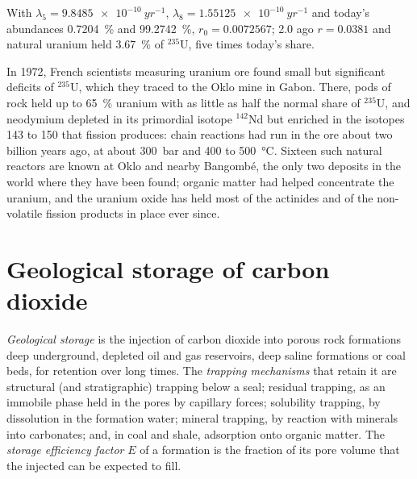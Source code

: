 With $\lambda_5 = \qty{9.8485e-10}{yr^{-1}}$, $\lambda_8 = \qty{1.55125e-10}{yr^{-1}}$ and today's
abundances \qty{0.7204}{\percent} and \qty{99.2742}{\percent}, $r_0 = 0.0072567$; \qty{2.0}{\Ga}
ago $r = 0.0381$ and natural uranium held \qty{3.67}{\percent} of $^{235}$U, five times today's
share.

\begin{history}
In 1972, French scientists measuring uranium ore found small but significant deficits of
$^{235}$U, which they traced to the Oklo mine in Gabon. There, pods of rock held up to
\qty{65}{\percent} uranium with as little as half the normal share of $^{235}$U, and neodymium
depleted in its primordial isotope $^{142}$Nd but enriched in the isotopes 143 to 150 that fission
produces: chain reactions had run in the ore about two billion years ago, at about \qty{300}{bar}
and 400 to \qty{500}{\celsius}. Sixteen such natural reactors are known at Oklo and nearby
Bangombé, the only two deposits in the world where they have been found; organic matter had helped
concentrate the uranium, and the uranium oxide has held most of the actinides and of the
non-volatile fission products in place ever since.
\end{history}

\section{Geological storage of carbon dioxide}\label{sec:b2:energy-geology:ccs}

\begin{definition}\label{def:b2:energy-geology:ccs}
\emph{Geological  storage} is the injection of carbon
dioxide into porous rock formations deep underground, depleted oil and gas reservoirs, deep saline
formations or coal beds, for retention over long times. The \emph{ trapping
mechanisms} that retain it are structural (and stratigraphic)
trapping below a seal; residual trapping, as an immobile phase held in the pores by capillary
forces; solubility trapping, by dissolution in the formation water; mineral trapping, by reaction
with minerals into carbonates; and, in coal and shale, adsorption onto organic matter. The \emph{storage efficiency factor} $E$ of a formation is the fraction of its pore volume that the injected
 can be expected to fill.
\end{definition}

